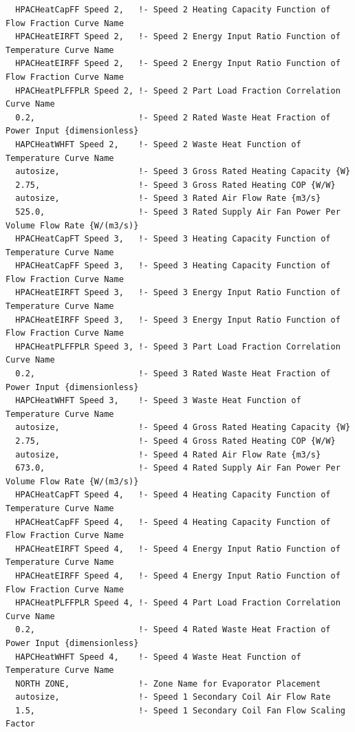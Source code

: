 \begin{lstlisting}
  HPACHeatCapFF Speed 2,   !- Speed 2 Heating Capacity Function of Flow Fraction Curve Name
  HPACHeatEIRFT Speed 2,   !- Speed 2 Energy Input Ratio Function of Temperature Curve Name
  HPACHeatEIRFF Speed 2,   !- Speed 2 Energy Input Ratio Function of Flow Fraction Curve Name
  HPACHeatPLFFPLR Speed 2, !- Speed 2 Part Load Fraction Correlation Curve Name
  0.2,                     !- Speed 2 Rated Waste Heat Fraction of Power Input {dimensionless}
  HAPCHeatWHFT Speed 2,    !- Speed 2 Waste Heat Function of Temperature Curve Name
  autosize,                !- Speed 3 Gross Rated Heating Capacity {W}
  2.75,                    !- Speed 3 Gross Rated Heating COP {W/W}
  autosize,                !- Speed 3 Rated Air Flow Rate {m3/s}
  525.0,                   !- Speed 3 Rated Supply Air Fan Power Per Volume Flow Rate {W/(m3/s)}
  HPACHeatCapFT Speed 3,   !- Speed 3 Heating Capacity Function of Temperature Curve Name
  HPACHeatCapFF Speed 3,   !- Speed 3 Heating Capacity Function of Flow Fraction Curve Name
  HPACHeatEIRFT Speed 3,   !- Speed 3 Energy Input Ratio Function of Temperature Curve Name
  HPACHeatEIRFF Speed 3,   !- Speed 3 Energy Input Ratio Function of Flow Fraction Curve Name
  HPACHeatPLFFPLR Speed 3, !- Speed 3 Part Load Fraction Correlation Curve Name
  0.2,                     !- Speed 3 Rated Waste Heat Fraction of Power Input {dimensionless}
  HAPCHeatWHFT Speed 3,    !- Speed 3 Waste Heat Function of Temperature Curve Name
  autosize,                !- Speed 4 Gross Rated Heating Capacity {W}
  2.75,                    !- Speed 4 Gross Rated Heating COP {W/W}
  autosize,                !- Speed 4 Rated Air Flow Rate {m3/s}
  673.0,                   !- Speed 4 Rated Supply Air Fan Power Per Volume Flow Rate {W/(m3/s)}
  HPACHeatCapFT Speed 4,   !- Speed 4 Heating Capacity Function of Temperature Curve Name
  HPACHeatCapFF Speed 4,   !- Speed 4 Heating Capacity Function of Flow Fraction Curve Name
  HPACHeatEIRFT Speed 4,   !- Speed 4 Energy Input Ratio Function of Temperature Curve Name
  HPACHeatEIRFF Speed 4,   !- Speed 4 Energy Input Ratio Function of Flow Fraction Curve Name
  HPACHeatPLFFPLR Speed 4, !- Speed 4 Part Load Fraction Correlation Curve Name
  0.2,                     !- Speed 4 Rated Waste Heat Fraction of Power Input {dimensionless}
  HAPCHeatWHFT Speed 4,    !- Speed 4 Waste Heat Function of Temperature Curve Name
  NORTH ZONE,              !- Zone Name for Evaporator Placement
  autosize,                !- Speed 1 Secondary Coil Air Flow Rate
  1.5,                     !- Speed 1 Secondary Coil Fan Flow Scaling Factor

\end{lstlisting}
